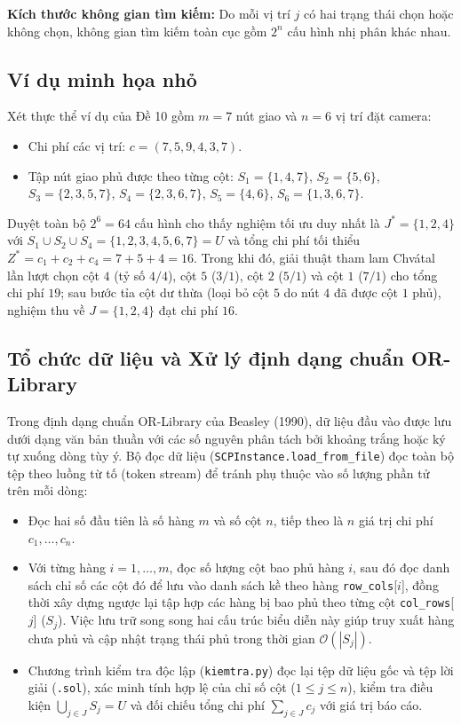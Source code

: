 \documentclass[11pt, a4paper]{article}
\begin{document}
\textbf{Kích thước không gian tìm kiếm:} Do mỗi vị trí $j$ có hai trạng thái chọn hoặc không chọn, không gian tìm kiếm toàn cục gồm $2^n$ cấu hình nhị phân khác nhau.

\subsection{Ví dụ minh họa nhỏ}
Xét thực thể ví dụ của Đề 10 gồm $m = 7$ nút giao và $n = 6$ vị trí đặt camera:
\begin{itemize}
    \item Chi phí các vị trí: $c = (7, 5, 9, 4, 3, 7)$.
    \item Tập nút giao phủ được theo từng cột: $S_1 = \{1, 4, 7\}$, $S_2 = \{5, 6\}$, $S_3 = \{2, 3, 5, 7\}$, $S_4 = \{2, 3, 6, 7\}$, $S_5 = \{4, 6\}$, $S_6 = \{1, 3, 6, 7\}$.
\end{itemize}
Duyệt toàn bộ $2^6 = 64$ cấu hình cho thấy nghiệm tối ưu duy nhất là $J^* = \{1, 2, 4\}$ với $S_1 \cup S_2 \cup S_4 = \{1, 2, 3, 4, 5, 6, 7\} = U$ và tổng chi phí tối thiểu $Z^* = c_1 + c_2 + c_4 = 7 + 5 + 4 = 16$. Trong khi đó, giải thuật tham lam Chvátal lần lượt chọn cột $4$ (tỷ số $4/4$), cột $5$ ($3/1$), cột $2$ ($5/1$) và cột $1$ ($7/1$) cho tổng chi phí $19$; sau bước tỉa cột dư thừa (loại bỏ cột $5$ do nút $4$ đã được cột $1$ phủ), nghiệm thu về $J = \{1, 2, 4\}$ đạt chi phí $16$.

\subsection{Tổ chức dữ liệu và Xử lý định dạng chuẩn OR-Library}
Trong định dạng chuẩn OR-Library của Beasley (1990), dữ liệu đầu vào được lưu dưới dạng văn bản thuần với các số nguyên phân tách bởi khoảng trắng hoặc ký tự xuống dòng tùy ý. Bộ đọc dữ liệu (\texttt{SCPInstance.load\_from\_file}) đọc toàn bộ tệp theo luồng từ tố (token stream) để tránh phụ thuộc vào số lượng phần tử trên mỗi dòng:
\begin{itemize}
    \item Đọc hai số đầu tiên là số hàng $m$ và số cột $n$, tiếp theo là $n$ giá trị chi phí $c_1, \dots, c_n$.
    \item Với từng hàng $i = 1, \dots, m$, đọc số lượng cột bao phủ hàng $i$, sau đó đọc danh sách chỉ số các cột đó để lưu vào danh sách kề theo hàng \texttt{row\_cols}[$i$], đồng thời xây dựng ngược lại tập hợp các hàng bị bao phủ theo từng cột \texttt{col\_rows}[$j$] ($S_j$). Việc lưu trữ song song hai cấu trúc biểu diễn này giúp truy xuất hàng chưa phủ và cập nhật trạng thái phủ trong thời gian $\mathcal{O}(|S_j|)$.
    \item Chương trình kiểm tra độc lập (\texttt{kiemtra.py}) đọc lại tệp dữ liệu gốc và tệp lời giải (\texttt{.sol}), xác minh tính hợp lệ của chỉ số cột ($1 \le j \le n$), kiểm tra điều kiện $\bigcup_{j \in J} S_j = U$ và đối chiếu tổng chi phí $\sum_{j \in J} c_j$ với giá trị báo cáo.
\end{itemize}
\end{document}
